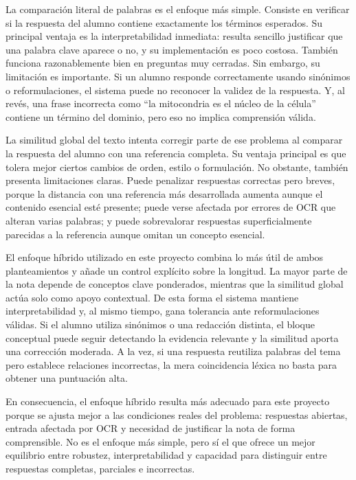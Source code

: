 La comparación literal de palabras es el enfoque más simple. Consiste en verificar si la respuesta del alumno contiene exactamente los términos esperados. Su principal ventaja es la interpretabilidad inmediata: resulta sencillo justificar que una palabra clave aparece o no, y su implementación es poco costosa. También funciona razonablemente bien en preguntas muy cerradas. Sin embargo, su limitación es importante. Si un alumno responde correctamente usando sinónimos o reformulaciones, el sistema puede no reconocer la validez de la respuesta. Y, al revés, una frase incorrecta como ``la mitocondria es el núcleo de la célula'' contiene un término del dominio, pero eso no implica comprensión válida.

La similitud global del texto intenta corregir parte de ese problema al comparar la respuesta del alumno con una referencia completa. Su ventaja principal es que tolera mejor ciertos cambios de orden, estilo o formulación. No obstante, también presenta limitaciones claras. Puede penalizar respuestas correctas pero breves, porque la distancia con una referencia más desarrollada aumenta aunque el contenido esencial esté presente; puede verse afectada por errores de OCR que alteran varias palabras; y puede sobrevalorar respuestas superficialmente parecidas a la referencia aunque omitan un concepto esencial.

El enfoque híbrido utilizado en este proyecto combina lo más útil de ambos planteamientos y añade un control explícito sobre la longitud. La mayor parte de la nota depende de conceptos clave ponderados, mientras que la similitud global actúa solo como apoyo contextual. De esta forma el sistema mantiene interpretabilidad y, al mismo tiempo, gana tolerancia ante reformulaciones válidas. Si el alumno utiliza sinónimos o una redacción distinta, el bloque conceptual puede seguir detectando la evidencia relevante y la similitud aporta una corrección moderada. A la vez, si una respuesta reutiliza palabras del tema pero establece relaciones incorrectas, la mera coincidencia léxica no basta para obtener una puntuación alta.

En consecuencia, el enfoque híbrido resulta más adecuado para este proyecto porque se ajusta mejor a las condiciones reales del problema: respuestas abiertas, entrada afectada por OCR y necesidad de justificar la nota de forma comprensible. No es el enfoque más simple, pero sí el que ofrece un mejor equilibrio entre robustez, interpretabilidad y capacidad para distinguir entre respuestas completas, parciales e incorrectas.

